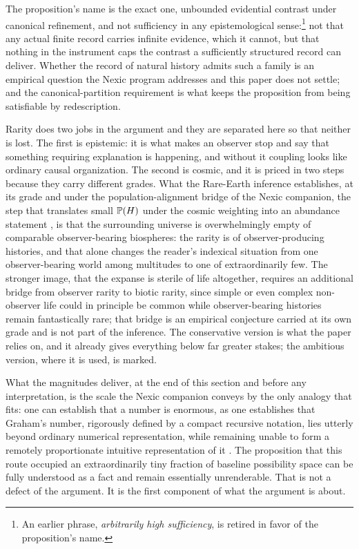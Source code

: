\noindent The proposition's name is the exact one, unbounded evidential
contrast under canonical refinement, and not sufficiency in any
epistemological sense:\footnote{An earlier phrase, \emph{arbitrarily
high sufficiency}, is retired in favor of the proposition's name.} not
that any actual finite record carries infinite evidence, which it
cannot, but that nothing in the instrument caps the contrast a
sufficiently structured record can deliver. Whether the record of natural history admits such a family is
an empirical question the Nexic program addresses and this paper does
not settle; and the canonical-partition requirement is what keeps the
proposition from being satisfiable by redescription.

Rarity does two jobs in the argument and they are separated here so
that neither is lost. The first is epistemic: it is what makes an
observer stop and say that something requiring explanation is happening,
and without it coupling looks like ordinary causal organization. The
second is cosmic, and it is priced in two steps because they carry
different grades. What the Rare-Earth inference establishes, at its grade and under the
population-alignment bridge of the Nexic companion, the step that
translates small $\mathbb{P}(H)$ under the cosmic weighting into an abundance
statement \cite{Nexus}, is that the surrounding universe is
overwhelmingly empty of comparable observer-bearing biospheres: the rarity is of
observer-producing histories, and that alone changes the reader's
indexical situation from one observer-bearing world among multitudes to
one of extraordinarily few. The stronger image, that the expanse is
sterile of life altogether, requires an additional bridge from observer
rarity to biotic rarity, since simple or even complex non-observer life
could in principle be common while observer-bearing histories remain
fantastically rare; that bridge is an empirical conjecture carried at
its own grade and is not part of the inference. The conservative version
is what the paper relies on, and it already gives everything below far
greater stakes; the ambitious version, where it is used, is marked.

What the magnitudes deliver, at the end of this section and before any
interpretation, is the scale the Nexic companion conveys by the only
analogy that fits: one can establish that a number is enormous, as one
establishes that Graham's number, rigorously defined by a compact
recursive notation, lies utterly beyond ordinary numerical
representation, while remaining unable to form a remotely proportionate
intuitive representation of it \cite{gardner1977mathematical}. The
proposition that this route occupied an extraordinarily tiny fraction
of baseline possibility space can be fully understood as a fact and
remain essentially unrenderable. That is not a defect of the argument.
It is the first component of what the argument is about.

